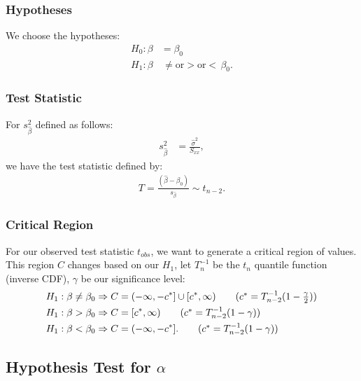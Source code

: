 \documentclass[a4paper, 12pt, twoside]{article}
\begin{document}
\subsubsection{Hypotheses}

We choose the hypotheses:
\begin{align*}
    H_0 : \beta & = \beta_0                                   \\
    H_1 : \beta & \, \neq \text{or} > \text{or} < \, \beta_0.
\end{align*}

\subsubsection{Test Statistic}

For $s_{\hat\beta}^2$ defined as follows:
\begin{align*}
    s_{\hat\beta}^2 & = \frac{\hat\sigma^2}{S_{xx}},
\end{align*}
we have the test statistic defined by:
\begin{align*}
    T = \frac{(\hat\beta - \beta_0)}{s_{\hat\beta}}
    \sim t_{n - 2}.
\end{align*}

\subsubsection{Critical Region}

For our observed test statistic $t_{obs}$, we want to generate a
critical region of values. This region $C$ changes based on our
$H_1$, let $T^{-1}_n$ be the $t_n$ quantile function
(inverse CDF), $\gamma$ be our significance level:
\begin{align*}
    H_1 : \beta \neq \beta_0 & \Rightarrow
    C = (-\infty, -c^*] \cup [c^*, \infty)
    \tag{$ c^* = T_{n-2}^{-1}(1 - \frac{\gamma}{2}) $} \\
    H_1 : \beta > \beta_0    & \Rightarrow
    C = [c^*, \infty)
    \tag{$ c^* = T_{n-2}^{-1}(1 - \gamma) $}           \\
    H_1 : \beta < \beta_0    & \Rightarrow
    C = (-\infty, -c^*].
    \tag{$ c^* = T_{n-2}^{-1}(1 - \gamma) $}
\end{align*}

\newpage

\subsection{Hypothesis Test for $\alpha$}
\end{document}
